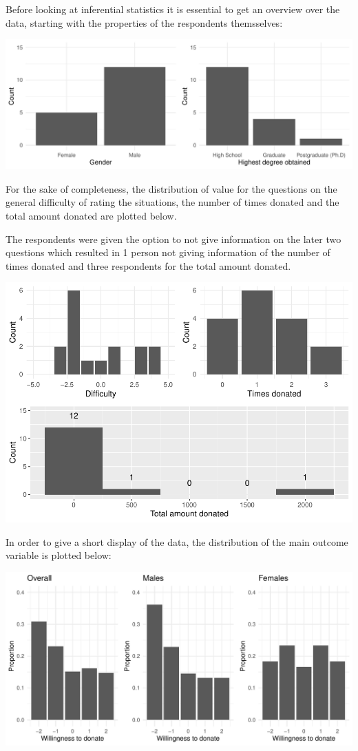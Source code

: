 \documentclass[
  12pt,
]{article}
\begin{document}
Before looking at inferential statistics it is essential to get an
overview over the data, starting with the properties of the respondents
themsselves:

\includegraphics[width=1.05\linewidth]{FSE_paper_files/figure-latex/unnamed-chunk-2-1}

For the sake of completeness, the distribution of value for the
questions on the general difficulty of rating the situations, the number
of times donated and the total amount donated are plotted below.

The respondents were given the option to not give information on the
later two questions which resulted in 1 person not giving information of
the number of times donated and three respondents for the total amount
donated.

\includegraphics{FSE_paper_files/figure-latex/plotting_b_questions-1.pdf}

In order to give a short display of the data, the distribution of the
main outcome variable is plotted below:

\includegraphics{FSE_paper_files/figure-latex/plotting_proportions-1.pdf}
\end{document}
